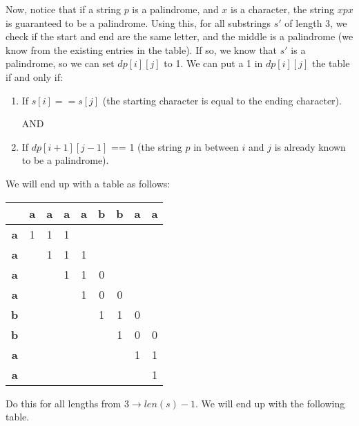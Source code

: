 Now, notice that if a string $p$ is a palindrome, and $x$ is a character, the string $xpx$ is guaranteed to be a palindrome.
Using this, for all substrings $s'$ of length 3, we check if the start and end are the same letter, and the middle is a palindrome (we know from the existing entries in the table).
If so, we know that $s'$ is a palindrome, so we can set $dp[i][j]$ to 1.
We can put a 1 in $dp[i][j]$ the table if and only if:

\begin{enumerate}
    \item If $s[i] == s[j]$ (the starting character is equal to the ending character).

    AND

    \item If $dp[i+1][j-1]$ == 1 (the string $p$ in between $i$ and $j$ is already known to be a palindrome).

\end{enumerate}

We will end up with a table as follows:

\begin{table}[htbp]
    \centering
    \begin{tabular}{|c|c|c|c|c|c|c|c|c|}
        \hline
          & \textbf{a} & \textbf{a} & \textbf{a} & \textbf{a} & \textbf{b} & \textbf{b} & \textbf{a} & \textbf{a} \\
        \hline
        \textbf{a} & 1 & 1 & 1 &  &  &  &  &  \\
        \hline
        \textbf{a} &  & 1 & 1 & 1 &  &  &  &  \\
        \hline
        \textbf{a} &  &  & 1 & 1 & 0 &  &  &  \\
        \hline
        \textbf{a} &  &  &  & 1 & 0 & 0 &  &  \\
        \hline
        \textbf{b} &  &  &  &  & 1 & 1 & 0 &  \\
        \hline
        \textbf{b} &  &  &  &  &  & 1 & 0 & 0 \\
        \hline
        \textbf{a} &  &  &  &  &  &  & 1 & 1 \\
        \hline
        \textbf{a} &  &  &  &  &  &  &  & 1 \\
        \hline
    \end{tabular}
\end{table}

Do this for all lengths from $3 \rightarrow len(s) - 1$.
We will end up with the following table.

